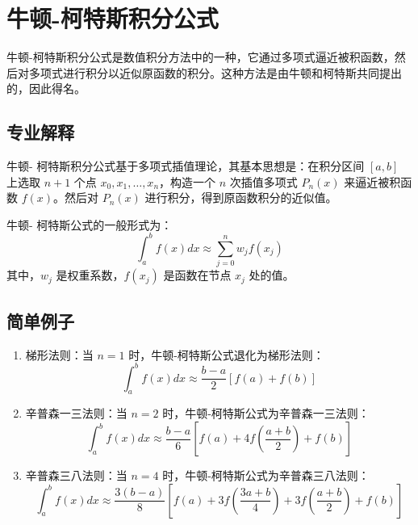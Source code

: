 \documentclass{ctexart}
\begin{document}
\section*{牛顿-柯特斯积分公式}

牛顿-柯特斯积分公式是数值积分方法中的一种，它通过多项式逼近被积函数，然后对多项式进行积分以近似原函数的积分。这种方法是由牛顿和柯特斯共同提出的，因此得名。

\subsection*{专业解释}

牛顿- 柯特斯积分公式基于多项式插值理论，其基本思想是：在积分区间 $[a, b]$ 上选取 $n+1$ 个点 $x_0, x_1, \ldots, x_n$，构造一个 $n$ 次插值多项式 $P_n(x)$ 来逼近被积函数 $f(x)$。然后对 $P_n(x)$ 进行积分，得到原函数积分的近似值。

牛顿- 柯特斯公式的一般形式为：
\begin{equation}
\int_{a}^{b} f(x) dx \approx \sum_{j=0}^{n} w_j f(x_j)
\end{equation}
其中，$w_j$ 是权重系数，$f(x_j)$ 是函数在节点 $x_j$ 处的值。

\subsection*{简单例子}

\begin{enumerate}
    \item 梯形法则：当 $n=1$ 时，牛顿-柯特斯公式退化为梯形法则：
    \begin{equation}
    \int_{a}^{b} f(x) dx \approx \frac{b-a}{2} [f(a) + f(b)]
    \end{equation}
    
    \item 辛普森一三法则：当 $n=2$ 时，牛顿-柯特斯公式为辛普森一三法则：
    \begin{equation}
    \int_{a}^{b} f(x) dx \approx \frac{b-a}{6} [f(a) + 4f\left(\frac{a+b}{2}\right) + f(b)]
    \end{equation}
    \item 辛普森三八法则：当 $n=4$ 时，牛顿-柯特斯公式为辛普森三八法则：
    \begin{equation}
    \int_{a}^{b} f(x) dx \approx \frac{3(b-a)}{8} [f(a) + 3f\left(\frac{3a+b}{4}\right) + 3f\left(\frac{a+b}{2}\right) + f(b)]
    \end{equation}
\end{enumerate}
\end{document}
